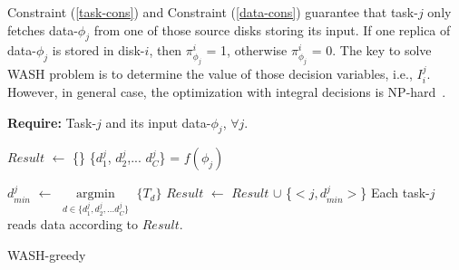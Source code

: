 \documentclass[conference]{IEEEtran}
\begin{document}
Constraint (\ref{task-cons}) and Constraint (\ref{data-cons}) guarantee that task-$j$ only fetches data-$\phi_j$ from one of those source disks storing its input. 
If one replica of data-$\phi_j$ is stored in disk-$i$, then $\pi_{\phi_j}^{i}$ = 1, otherwise $\pi_{\phi_j}^{i}$ = 0. 
The key to solve WASH problem is to determine the value of those decision variables, i.e., $I_i^j$. However, in general case, the optimization with integral decisions is NP-hard~\cite{b9}.




\begin{algorithm}[!t]

	\textbf{Require:} Task-$j$ and its input data-$\phi_j$, $\forall j$.

	\begin{algorithmic}[1]
		
		\State $Result$ $\gets$ \{\}\label{WASH-greedy:init}
			\State \{$d_{1}^j$, $d_{2}^j$,... $d_{C}^j$\} = $f(\phi_j)$
		
	
			\State $d_{min}^j$ $\gets$ $\mathop{\arg\min}\limits_{d \in \{d_{1}^j, d_{2}^j,... d_{C}^j\}}$ $\{T_d\}$
			\State $Result$ $\gets$ $Result$ $\cup$
			\{$< j, d_{min}^j>$\}
		\EndFor
	\State  Each task-$j$ reads data according to $Result$.
	\end{algorithmic}
	\caption{WASH-greedy}\label{WASH-greedy}
\end{algorithm}
\end{document}
